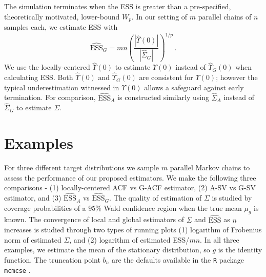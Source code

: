 \documentclass[12pt]{article}
\theoremstyle{remark}
\begin{document}
The simulation terminates when the ESS is greater than a pre-specified, theoretically motivated, lower-bound $W_{p}$. 
%
In our setting of $m$ parallel chains of $n$ samples each, we
%
 estimate ESS with
\[
\widehat{\textrm{ESS}}_G = mn\left(\dfrac{|\hat{\Upsilon}(0)|}{|\hat{\Sigma}_{G}|}\right)^{1/p}\, .
\]
We use the locally-centered $\hat{\Upsilon}(0)$ to estimate $\Upsilon(0)$ instead of $\hat{\Upsilon}_G(0)$ when calculating ESS. Both $\hat{\Upsilon}(0)$ and $\hat{\Upsilon}_G(0)$ are consistent  for $\Upsilon(0)$; however the typical underestimation witnessed in $\Upsilon(0)$ allows a safeguard against early termination. For comparison, $\widehat{\textrm{ESS}}_A$ is constructed similarly using $\hat{\Sigma}_A$ instead of $\hat{\Sigma}_G$ to estimate $\Sigma$.  


\section{Examples} \label{sec:examples}

For three different target distributions we sample $m$ parallel Markov chains to assess the performance of our proposed estimators. We make the following three comparisons - (1) locally-centered ACF vs G-ACF estimator, (2) A-SV vs G-SV estimator, and (3) $\widehat{\textrm{ESS}}_A$ vs $\widehat{\textrm{ESS}}_G$. The quality of estimation of $\Sigma$ is studied by coverage probabilities of a $95 \%$ Wald  confidence region when the true mean $\mu_g$ is known. The convergence of local and global estimators of $\Sigma$ and $\widehat{\textrm{ESS}}$ as $n$ increases is studied through two types of running plots (1) logarithm of Frobenius norm of estimated $\Sigma$, and (2) logarithm of estimated ESS/$mn$. In all three examples, we estimate the mean of the stationary distribution, so $g$ is the identity function. The truncation point $b_n$ are the defaults available in the \texttt{R} package \texttt{mcmcse} \citep{mcmcse}.
\end{document}
